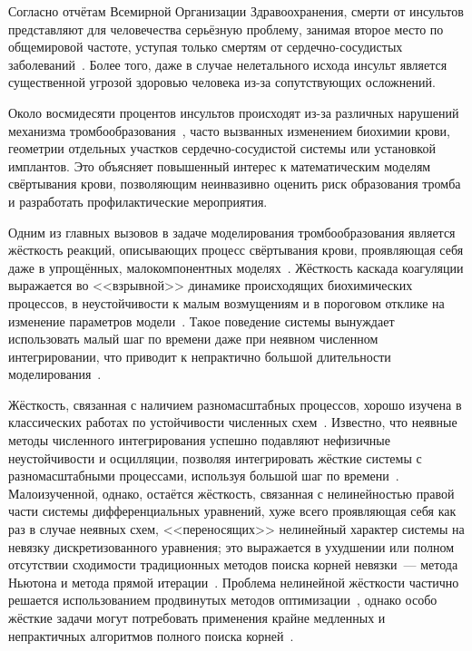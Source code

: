 \label{chapter:introduction} 

Согласно отчётам Всемирной Организации Здравоохранения,
смерти от инсультов представляют для человечества серьёзную проблему,
занимая второе место по общемировой частоте,
уступая только смертям от сердечно-сосудистых заболеваний~\cite{geoffrey2008stroke, who2020global_health_estimates}.
Более того, даже в случае нелетального исхода инсульт является существенной угрозой здоровью человека
из-за сопутствующих осложнений.

Около восмидесяти процентов инсультов происходят из-за различных нарушений механизма тромбообразования~\cite{geoffrey2008stroke},
часто вызванных изменением биохимии крови,
геометрии отдельных участков сердечно-сосудистой системы
или установкой имплантов.
Это объясняет повышенный интерес к математическим моделям свёртывания крови,
позволяющим неинвазивно оценить риск образования тромба и разработать профилактические мероприятия.

Одним из главных вызовов в задаче моделирования тромбообразования является жёсткость реакций,
описывающих процесс свёртывания крови,
проявляющая себя даже в упрощённых, малокомпонентных моделях~\cite{bouchnita2020mathematical}.
Жёсткость каскада коагуляции выражается во <<взрывной>> динамике происходящих биохимических процессов,
в неустойчивости к малым возмущениям и в пороговом отклике на изменение параметров модели~\cite{shen2008threshold}.
Такое поведение системы вынуждает использовать малый шаг по времени даже при неявном численном интегрировании,
что приводит к непрактично большой длительности моделирования~\cite{douglas1967generalizedrk}.

Жёсткость, связанная с наличием разномасштабных процессов,
хорошо изучена в классических работах по устойчивости численных схем~\cite{auzinger1993modern, dahlquist1963special, dahlquist1975stability, liu2019study}.
Известно, что неявные методы численного интегрирования успешно подавляют нефизичные неустойчивости и осцилляции,
позволяя интегрировать жёсткие системы с разномасштабными процессами,
используя большой шаг по времени~\cite{heirer1999solvingode2}.
Малоизученной, однако, остаётся жёсткость, связанная с нелинейностью правой части системы дифференциальных уравнений,
хуже всего проявляющая себя как раз в случае неявных схем,
<<переносящих>> нелинейный характер системы на невязку дискретизованного уравнения;
это выражается в ухудшении или полном отсутствии сходимости традиционных методов поиска корней невязки~---
метода Ньютона и метода прямой итерации~\cite{lambert1991methods}.
Проблема нелинейной жёсткости частично решается использованием продвинутых
методов оптимизации~\cite{brown1985experiments, alexander1991modified, moore1994stepsize, schlenkrich2006application},
однако особо жёсткие задачи могут потребовать применения крайне медленных и непрактичных алгоритмов
полного поиска корней~\cite{farrell2016computation}.

